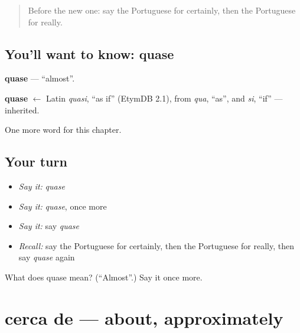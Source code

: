 \label{lesson:PT-C184-quase}



\begin{quote}
Before the new one: say the Portuguese for certainly, then the Portuguese for really.
\end{quote}

\subsection*{You'll want to know: quase}
\textbf{quase} — \textquotedblleft{}almost\textquotedblright{}.

\begin{cousinweb}
\textbf{quase} $\leftarrow$ Latin \emph{quasi}, \textquotedblleft{}as if\textquotedblright{} (EtymDB 2.1), from \emph{qua}, \textquotedblleft{}as\textquotedblright{}, and \emph{si}, \textquotedblleft{}if\textquotedblright{} — inherited.
\end{cousinweb}

\begin{grammarlens}[title={What you've built}]
One more word for this chapter.
\end{grammarlens}

\subsection*{Your turn}
\begin{itemize}
\raggedright
  \item \emph{Say it:} \emph{quase}
  \item \emph{Say it:} \emph{quase}, once more
  \item \emph{Say it:} say \emph{quase}
  \item \emph{Recall:} say the Portuguese for certainly, then the Portuguese for really, then say \emph{quase} again
\end{itemize}

\begin{tcolorbox}[breakable,colback=teal!4,colframe=teal!35!black,title={Before you move on}]
What does quase mean? (\textquotedblleft{}Almost\textquotedblright{}.) Say it once more.
\end{tcolorbox}
\section[cerca de]{cerca de — about, approximately}

\label{lesson:PT-C184-cerca-de}



